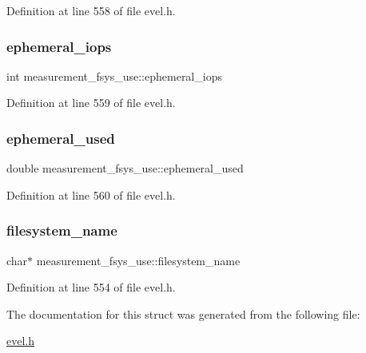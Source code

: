 Definition at line 558 of file evel.\+h.

\hypertarget{structmeasurement__fsys__use_a7389ea2d9e7a81e449b77eede1a3c691}{}\label{structmeasurement__fsys__use_a7389ea2d9e7a81e449b77eede1a3c691} 
\subsubsection{\texorpdfstring{ephemeral\+\_\+iops}{ephemeral\_iops}}
{\footnotesize\ttfamily int measurement\+\_\+fsys\+\_\+use\+::ephemeral\+\_\+iops}



Definition at line 559 of file evel.\+h.

\hypertarget{structmeasurement__fsys__use_a5b03b9de4fcc06f38446b20a0a1a6530}{}\label{structmeasurement__fsys__use_a5b03b9de4fcc06f38446b20a0a1a6530} 
\subsubsection{\texorpdfstring{ephemeral\+\_\+used}{ephemeral\_used}}
{\footnotesize\ttfamily double measurement\+\_\+fsys\+\_\+use\+::ephemeral\+\_\+used}



Definition at line 560 of file evel.\+h.

\hypertarget{structmeasurement__fsys__use_aacac02250f665f7b9b6fcf229c842c80}{}\label{structmeasurement__fsys__use_aacac02250f665f7b9b6fcf229c842c80} 
\subsubsection{\texorpdfstring{filesystem\+\_\+name}{filesystem\_name}}
{\footnotesize\ttfamily char$\ast$ measurement\+\_\+fsys\+\_\+use\+::filesystem\+\_\+name}



Definition at line 554 of file evel.\+h.



The documentation for this struct was generated from the following file\+:\begin{DoxyCompactItemize}
\item 
\hyperlink{evel_8h}{evel.\+h}\end{DoxyCompactItemize}
